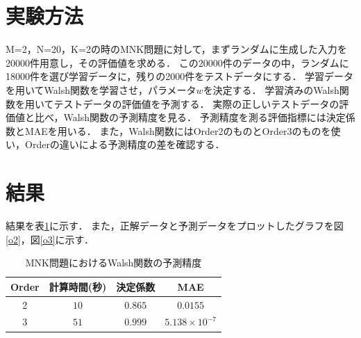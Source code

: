 \documentclass[main]{subfiles}
\begin{document}
        \section{実験方法}
        M=2，N=20，K=2の時のMNK問題に対して，まずランダムに生成した入力を20000件用意し，その評価値を求める．
        この20000件のデータの中，ランダムに18000件を選び学習データに，残りの2000件をテストデータにする．
        学習データを用いてWalsh関数を学習させ，パラメータ$w$を決定する．
        学習済みのWalsh関数を用いてテストデータの評価値を予測する．
        実際の正しいテストデータの評価値と比べ，Walsh関数の予測精度を見る．
        予測精度を測る評価指標には決定係数とMAEを用いる．
        また，Walsh関数にはOrder2のものとOrder3のものを使い，Orderの違いによる予測精度の差を確認する．

        \section{結果}
        結果を表\ref{mnk_result}に示す．
        また，正解データと予測データをプロットしたグラフを図\ref{o2}，図\ref{o3}に示す．
        \begin{table}[h]
            \centering
            \caption{MNK問題におけるWalsh関数の予測精度}
            \begin{tabular}{c|ccc}
              Order & 計算時間(秒) & 決定係数 & MAE\\ \hline
              2 & $10$ & $0.865$ & $0.0155$ \\
              3 & $51$ & $0.999$ & $5.138 \times 10^{-7}$ \\
            \end{tabular}
            \label{mnk_result}
        \end{table}
\end{document}
